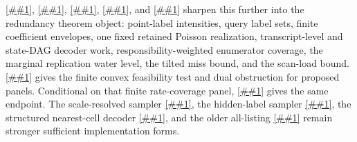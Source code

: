 \documentclass[10pt]{article}
\newcommand{\cref}[1]{\ref{##1}}
\newcommand{\Cref}[1]{\ref{##1}}
\theoremstyle{definition}
\begin{document}
\cref{cor:finite-transcript-rate-coverage}, \cref{cor:compressed-decoder-dag-rate-coverage}, \cref{cor:output-sensitive-decoder-dag-rate-coverage}, \cref{lem:scalar-redundancy-waterfill}, and \cref{asm:rate-coverage-panel} sharpen this further into the redundancy theorem object: point-label intensities, query label sets, finite coefficient envelopes, one fixed retained Poisson realization, transcript-level and state-DAG decoder work, responsibility-weighted enumerator coverage, the marginal replication water level, the tilted miss bound, and the scan-load bound. \Cref{lem:finite-rate-coverage-convex} gives the finite convex feasibility test and dual obstruction for proposed panels. Conditional on that finite rate-coverage panel, \cref{prop:rate-coverage-polylog} gives the same endpoint. The scale-resolved sampler \cref{asm:ideal-likelihood-leader-law-sampler}, the hidden-label sampler \cref{asm:normalized-likelihood-leader-sampler}, the structured nearest-cell decoder \cref{asm:smoothed-nearest-cell}, and the older all-listing \cref{asm:multiscale-structured-likelihood} remain stronger sufficient implementation forms.
\end{document}

